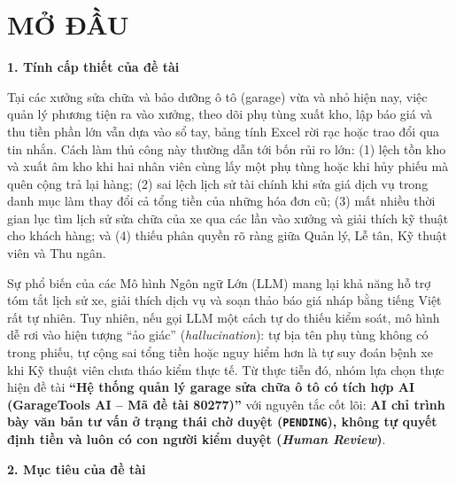 \chapter*{MỞ ĐẦU}

\textbf{1. Tính cấp thiết của đề tài}

Tại các xưởng sửa chữa và bảo dưỡng ô tô (garage) vừa và nhỏ hiện nay, việc quản lý phương tiện ra vào xưởng, theo dõi phụ tùng xuất kho, lập báo giá và thu tiền phần lớn vẫn dựa vào sổ tay, bảng tính Excel rời rạc hoặc trao đổi qua tin nhắn. Cách làm thủ công này thường dẫn tới bốn rủi ro lớn: (1) lệch tồn kho và xuất âm kho khi hai nhân viên cùng lấy một phụ tùng hoặc khi hủy phiếu mà quên cộng trả lại hàng; (2) sai lệch lịch sử tài chính khi sửa giá dịch vụ trong danh mục làm thay đổi cả tổng tiền của những hóa đơn cũ; (3) mất nhiều thời gian lục tìm lịch sử sửa chữa của xe qua các lần vào xưởng và giải thích kỹ thuật cho khách hàng; và (4) thiếu phân quyền rõ ràng giữa Quản lý, Lễ tân, Kỹ thuật viên và Thu ngân.

Sự phổ biến của các Mô hình Ngôn ngữ Lớn (LLM) mang lại khả năng hỗ trợ tóm tắt lịch sử xe, giải thích dịch vụ và soạn thảo báo giá nháp bằng tiếng Việt rất tự nhiên. Tuy nhiên, nếu gọi LLM một cách tự do thiếu kiểm soát, mô hình dễ rơi vào hiện tượng “ảo giác” (\textit{hallucination}): tự bịa tên phụ tùng không có trong phiếu, tự cộng sai tổng tiền hoặc nguy hiểm hơn là tự suy đoán bệnh xe khi Kỹ thuật viên chưa tháo kiểm thực tế. Từ thực tiễn đó, nhóm lựa chọn thực hiện đề tài \textbf{“Hệ thống quản lý garage sửa chữa ô tô có tích hợp AI (GarageTools AI -- Mã đề tài 80277)”} với nguyên tắc cốt lõi: \textbf{AI chỉ trình bày văn bản tư vấn ở trạng thái chờ duyệt (\texttt{PENDING}), không tự quyết định tiền và luôn có con người kiểm duyệt (\textit{Human Review})}.

\textbf{2. Mục tiêu của đề tài}

